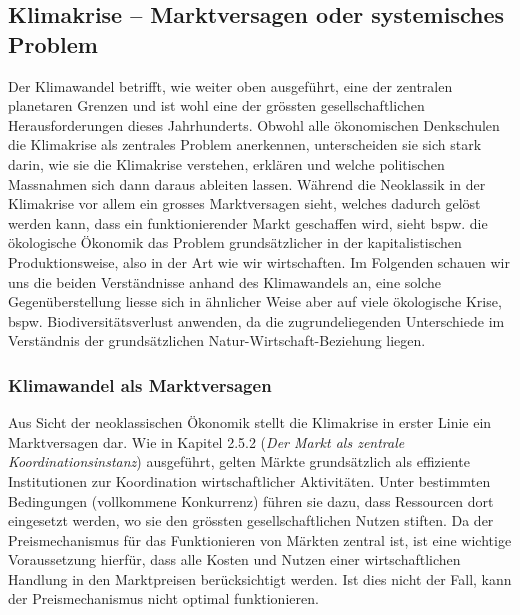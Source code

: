 \documentclass[
  nswissgerman,
  a4paper,
  DIV=11,
  numbers=noendperiod,
  oneside,
  openany]{scrreprt}
\begin{document}
\subsection{Klimakrise -- Marktversagen oder systemisches
Problem}\label{klimakrise-marktversagen-oder-systemisches-problem}

Der Klimawandel betrifft, wie weiter oben ausgeführt, eine der zentralen
planetaren Grenzen und ist wohl eine der grössten gesellschaftlichen
Herausforderungen dieses Jahrhunderts. Obwohl alle ökonomischen
Denkschulen die Klimakrise als zentrales Problem anerkennen,
unterscheiden sie sich stark darin, wie sie die Klimakrise verstehen,
erklären und welche politischen Massnahmen sich dann daraus ableiten
lassen. Während die Neoklassik in der Klimakrise vor allem ein grosses
Marktversagen sieht, welches dadurch gelöst werden kann, dass ein
funktionierender Markt geschaffen wird, sieht bspw. die ökologische
Ökonomik das Problem grundsätzlicher in der kapitalistischen
Produktionsweise, also in der Art wie wir wirtschaften. Im Folgenden
schauen wir uns die beiden Verständnisse anhand des Klimawandels an,
eine solche Gegenüberstellung liesse sich in ähnlicher Weise aber auf
viele ökologische Krise, bspw. Biodiversitätsverlust anwenden, da die
zugrundeliegenden Unterschiede im Verständnis der grundsätzlichen
Natur-Wirtschaft-Beziehung liegen.

\subsubsection{Klimawandel als
Marktversagen}\label{klimawandel-als-marktversagen}

Aus Sicht der neoklassischen Ökonomik stellt die Klimakrise in erster
Linie ein Marktversagen dar. Wie in Kapitel 2.5.2 (\emph{Der Markt als
zentrale Koordinationsinstanz}) ausgeführt, gelten Märkte grundsätzlich
als effiziente Institutionen zur Koordination wirtschaftlicher
Aktivitäten. Unter bestimmten Bedingungen (vollkommene Konkurrenz)
führen sie dazu, dass Ressourcen dort eingesetzt werden, wo sie den
grössten gesellschaftlichen Nutzen stiften. Da der Preismechanismus für
das Funktionieren von Märkten zentral ist, ist eine wichtige
Voraussetzung hierfür, dass alle Kosten und Nutzen einer
wirtschaftlichen Handlung in den Marktpreisen berücksichtigt werden. Ist
dies nicht der Fall, kann der Preismechanismus nicht optimal
funktionieren.
\end{document}
